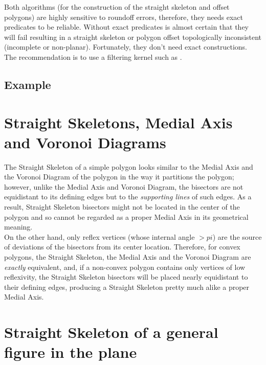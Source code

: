 Both algorithms (for the construction of the straight skeleton and offset polygons) are highly sensitive to roundoff errors, therefore, they needs exact predicates to be reliable. Without exact predicates is almost certain that they will fail resulting in a straight skeleton or polygon offset topologically inconsistent (incomplete or non-planar). Fortunately, they don't need exact constructions.\\
The recommendation is to use a filtering kernel such as .

\subsection{Example}


\section{Straight Skeletons, Medial Axis and Voronoi Diagrams}  

The Straight Skeleton of a simple polygon looks similar to the Medial Axis and the Voronoi Diagram of the polygon in the way it partitions the polygon; however, unlike the Medial Axis and Voronoi Diagram, the
bisectors are not equidistant to its defining edges but to the \textit{supporting lines} of such edges. As a result, Straight Skeleton bisectors might not be located in the center of the polygon and so cannot be regarded as a proper Medial Axis in its geometrical meaning.\\
On the other hand, only reflex vertices (whose internal angle $>pi$) are the source of deviations of the bisectors from its center location. Therefore, for convex polygons, the Straight Skeleton, the Medial Axis
and the Voronoi Diagram are \textit{exactly} equivalent, and, if a non-convex 
polygon contains only vertices of low reflexivity, the Straight Skeleton bisectors will be placed nearly equidistant to their defining edges, producing a Straight Skeleton pretty much alike a proper Medial Axis.


\section{Straight Skeleton of a general figure in the plane}

